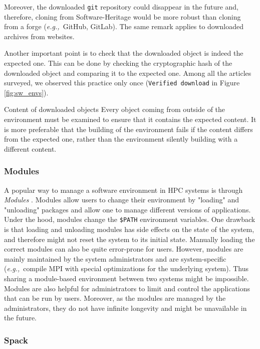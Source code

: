 \documentclass[sigconf,natbib=false]{acmart}
\newcommand{\eg}{\emph{e.g.,}}
\newcommand{\todo}[1]{{\color{red}{TODO: #1}}}
\begin{document}
Moreover, the downloaded \texttt{git} repository could disappear in the future and, therefore, cloning from Software-Heritage would be more robust than cloning from a forge (\eg\ GitHub, GitLab).
The same remark applies to downloaded archives from websites.

Another important point is to check that the downloaded object is indeed the expected one.
This can be done by checking the cryptographic hash of the downloaded object and comparing it to the expected one.
Among all the articles surveyed, we observed this practice only once (\texttt{Verified download} in Figure \ref{fig:sw_envs}).

\begin{lesson}{Content of downloaded objects}{}
Every object coming from outside of the environment must be examined to ensure that it contains the expected content.
It is more preferable that the building of the environment fails if the content differs from the expected one, rather than the environment silently building with a different content.
\end{lesson}

\subsubsection{Modules}

A popular way to manage a software environment in HPC systems is through \emph{Modules} \cite{furlani1991modules, modules}.
Modules allow users to change their environment by "loading" and "unloading" packages and allow one to manage different versions of applications. 
Under the hood, modules change the \texttt{\$PATH} environment variables.
One drawback is that loading and unloading modules has side effects on the state of the system, and therefore might not reset the system to its initial state.
Manually loading the correct modules can also be quite error-prone for users.
However, modules are mainly maintained by the system administrators and are system-specific (\eg\ compile MPI with special optimizations for the underlying system).
Thus sharing a module-based environment between two systems might be impossible.
Modules are also helpful for administrators to limit and control the applications that can be run by users.
Moreover, as the modules are managed by the administrators, they do not have infinite longevity and might be unavailable in the future.

\subsubsection{Spack}
\end{document}
